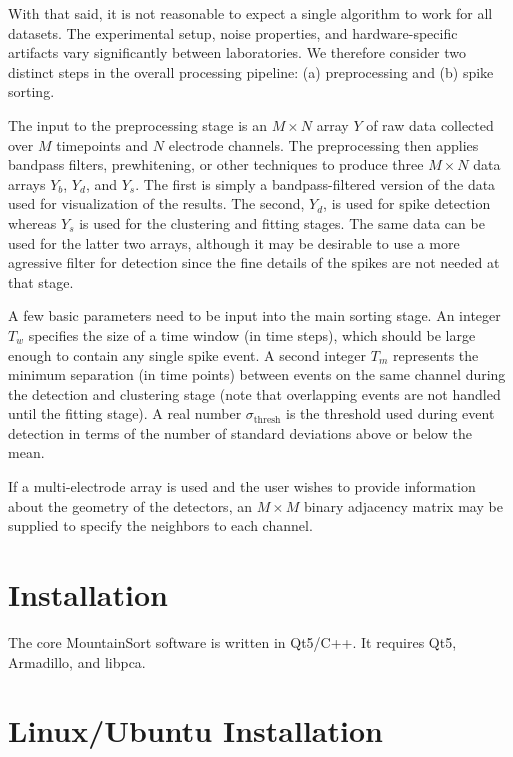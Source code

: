 \documentclass[hidelinks,10pt]{article}
\begin{document}
With that said, it is not reasonable to expect a single algorithm to work for all datasets. The experimental setup, noise properties, and hardware-specific artifacts vary significantly between laboratories. We therefore consider two distinct steps in the overall processing pipeline: (a) preprocessing and (b) spike sorting. 

The input to the preprocessing stage is an $M\times N$ array $Y$ of raw data collected over $M$ timepoints and $N$ electrode channels. The preprocessing then applies bandpass filters, prewhitening, or other techniques to produce three $M\times N$ data arrays $Y_b$, $Y_d$, and $Y_s$. The first is simply a bandpass-filtered version of the data used for visualization of the results. The second, $Y_d$, is used for spike detection whereas $Y_s$ is used for the clustering and fitting stages. The same data can be used for the latter two arrays, although it may be desirable to use a more agressive filter for detection since the fine details of the spikes are not needed at that stage.

A few basic parameters need to be input into the main sorting stage. An integer $T_w$ specifies the size of a time window (in time steps), which should be large enough to contain any single spike event. A second integer $T_m$ represents the minimum separation (in time points) between events on the same channel during the detection and clustering stage (note that overlapping events are not handled until the fitting stage). A real number $\sigma_\text{thresh}$ is the threshold used during event detection in terms of the number of standard deviations above or below the mean.

If a multi-electrode array is used and the user wishes to provide information about the geometry of the detectors, an $M\times M$ binary adjacency matrix may be supplied to specify the neighbors to each channel.

\section {Installation}


The core MountainSort software is written in Qt5/C++. It requires Qt5, Armadillo, and libpca.

\section {Linux/Ubuntu Installation}
\end{document}
